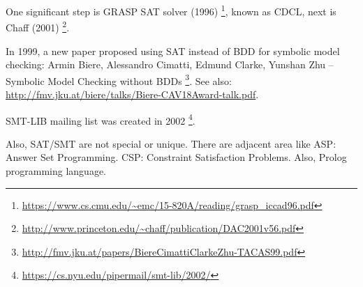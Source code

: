 One significant step is GRASP SAT solver (1996)
\footnote{\url{https://www.cs.cmu.edu/~emc/15-820A/reading/grasp_iccad96.pdf}}, known as \ac{CDCL},
next is Chaff (2001)
\footnote{\url{http://www.princeton.edu/~chaff/publication/DAC2001v56.pdf}}.

In 1999, a new paper proposed using SAT instead of BDD for symbolic model checking:
Armin Biere, Alessandro Cimatti, Edmund Clarke, Yunshan Zhu -- Symbolic Model Checking without BDDs
\footnote{\url{http://fmv.jku.at/papers/BiereCimattiClarkeZhu-TACAS99.pdf}}.
See also: \url{http://fmv.jku.at/biere/talks/Biere-CAV18Award-talk.pdf}.

SMT-LIB mailing list was created in 2002
\footnote{\url{https://cs.nyu.edu/pipermail/smt-lib/2002/}}.

Also, SAT/SMT are not special or unique.
There are adjacent area like ASP: Answer Set Programming.
CSP: Constraint Satisfaction Problems.
Also, Prolog programming language.

